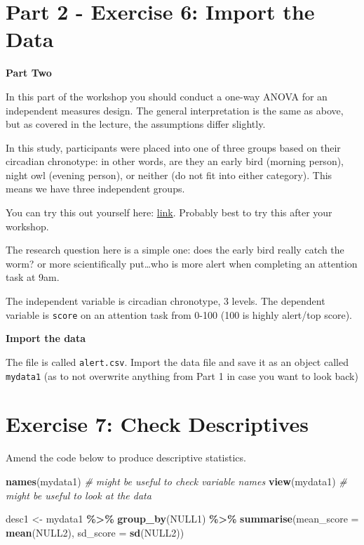 \documentclass[
]{book}
\newenvironment{Shaded}{\begin{snugshade}}{\end{snugshade}}
\newcommand{\AttributeTok}[1]{\textcolor[rgb]{0.13,0.29,0.53}{#1}}
\newcommand{\CommentTok}[1]{\textcolor[rgb]{0.56,0.35,0.01}{\textit{#1}}}
\newcommand{\FunctionTok}[1]{\textcolor[rgb]{0.13,0.29,0.53}{\textbf{#1}}}
\newcommand{\NormalTok}[1]{#1}
\newcommand{\OtherTok}[1]{\textcolor[rgb]{0.56,0.35,0.01}{#1}}
\newcommand{\SpecialCharTok}[1]{\textcolor[rgb]{0.81,0.36,0.00}{\textbf{#1}}}
\let\oldsection\section
\renewcommand{\section}{\needspace{5\baselineskip}\oldsection}
\begin{document}
\section{Part 2 - Exercise 6: Import the Data}\label{part-2---exercise-6-import-the-data}

\textbf{Part Two}

In this part of the workshop you should conduct a one-way ANOVA for an independent measures design. The general interpretation is the same as above, but as covered in the lecture, the assumptions differ slightly.

In this study, participants were placed into one of three groups based on their circadian chronotype: in other words, are they an early bird (morning person), night owl (evening person), or neither (do not fit into either category). This means we have three independent groups.

You can try this out yourself here: \href{https://qxmd.com/calculate/calculator_829/morningness-eveningness-questionnaire-meq\#}{link}. Probably best to try this after your workshop.

The research question here is a simple one: does the early bird really catch the worm? or more scientifically put\ldots who is more alert when completing an attention task at 9am.

The independent variable is circadian chronotype, 3 levels. The dependent variable is \texttt{score} on an attention task from 0-100 (100 is highly alert/top score).

\textbf{Import the data}

The file is called \texttt{alert.csv}. Import the data file and save it as an object called \texttt{mydata1} (as to not overwrite anything from Part 1 in case you want to look back)

\section{Exercise 7: Check Descriptives}\label{exercise-7-check-descriptives}

Amend the code below to produce descriptive statistics.

\begin{Shaded}
\begin{Highlighting}[]
\FunctionTok{names}\NormalTok{(mydata1)  }\CommentTok{\# might be useful to check variable names}
\FunctionTok{view}\NormalTok{(mydata1)   }\CommentTok{\# might be useful to look at the data}

\NormalTok{desc1 }\OtherTok{\textless{}{-}}\NormalTok{ mydata1 }\SpecialCharTok{\%\textgreater{}\%}
  \FunctionTok{group\_by}\NormalTok{(NULL1) }\SpecialCharTok{\%\textgreater{}\%}
  \FunctionTok{summarise}\NormalTok{(}\AttributeTok{mean\_score =} \FunctionTok{mean}\NormalTok{(NULL2),}
            \AttributeTok{sd\_score =} \FunctionTok{sd}\NormalTok{(NULL2))}
\end{Highlighting}
\end{Shaded}
\end{document}
